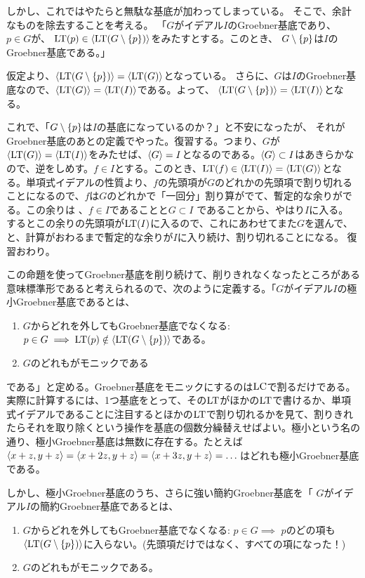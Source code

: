 \documentclass[9pt]{ltjsarticle}
\begin{document}
しかし、これではやたらと無駄な基底が加わってしまっている。
そこで、余計なものを除去することを考える。
「$G$がイデアル$I$のGroebner基底であり、$p\in G$が、
${\rm LT}(p) \in \left\langle {\rm LT}(G\setminus \left\{p\right\}) \right\rangle$をみたすとする。このとき、
$G\setminus\left\{p\right\}$は$I$のGroebner基底である。」
\begin{myproof}
 仮定より、$\left\langle {\rm LT}(G\setminus \left\{p\right\}) \right\rangle = \left\langle {\rm LT}(G) \right\rangle$となっている。
 さらに、$G$は$I$のGroebner基底なので、$\left\langle {\rm LT}(G) \right\rangle = \left\langle {\rm LT}(I) \right\rangle$である。よって、
 $\left\langle {\rm LT}(G\setminus \left\{p\right\}) \right\rangle = \left\langle {\rm LT}(I) \right\rangle$となる。
\end{myproof}
これで、「$G\setminus \left\{p\right\}$は$I$の基底になっているのか？」と不安になったが、
それがGroebner基底のあとの定義でやった。復習する。つまり、$G$が$\left\langle {\rm LT}(G) \right\rangle = \left\langle {\rm LT}(I) \right\rangle$をみたせば、$\left\langle G \right\rangle = I$となるのである。$\left\langle G \right\rangle\subset I$はあきらかなので、逆をしめす。$f\in I$とする。このとき、${\rm LT}(f) \in \left\langle {\rm LT}(I) \right\rangle = \left\langle {\rm LT}(G) \right\rangle$となる。単項式イデアルの性質より、$f$の先頭項が$G$のどれかの先頭項で割り切れることになるので、$f$は$G$のどれかで「一回分」割り算がでて、暫定的な余りがでる。この余りは
、$f\in I$であることと$G\subset I$ であることから、やはり$I$に入る。
するとこの余りの先頭項が${\rm LT}(I)$に入るので、これにあわせてまた$G$を選んで、と、計算がおわるまで暫定的な余りが$I$に入り続け、割り切れることになる。
復習おわり。

この命題を使ってGroebner基底を削り続けて、削りきれなくなったところがある意味標準形であると考えられるので、次のように定義する。「$G$がイデアル$I$の極小Groebner基底であるとは、
\begin{enumerate}[label=(\arabic*)]
  \item $G$からどれを外してもGroebner基底でなくなる: $p \in G \implies {\rm LT}(p) \notin \left\langle {\rm LT}(G\setminus \left\{p\right\}) \right\rangle$である。
  \item $G$のどれもがモニックである
\end{enumerate}
である」と定める。Groebner基底をモニックにするのは${\rm LC}$で割るだけである。
実際に計算するには、1つ基底をとって、その${\rm LT}$がほかの${\rm LT}$で書けるか、単項式イデアルであることに注目するとほかの${\rm LT}$で割り切れるかを見て、割りきれたらそれを取り除くという操作を基底の個数分繰替えせばよい。極小という名の通り、極小Groebner基底は無数に存在する。たとえば$\left\langle x+z,y+z \right\rangle = \left\langle x+2z,y+z \right\rangle = \left\langle x+3z,y+z \right\rangle=\dots$はどれも極小Groebner基底である。

しかし、極小Groebner基底のうち、さらに強い簡約Groebner基底を「
$G$がイデアル$I$の簡約Groebner基底であるとは、
\begin{enumerate}[label=(\arabic*)]
  \item $G$からどれを外してもGroebner基底でなくなる: $p \in G \implies $ $p$のどの項も$\left\langle {\rm LT}(G\setminus \left\{p\right\}) \right\rangle$に入らない。(先頭項だけではなく、すべての項になった！)
  \item $G$のどれもがモニックである。
\end{enumerate}
\end{document}
